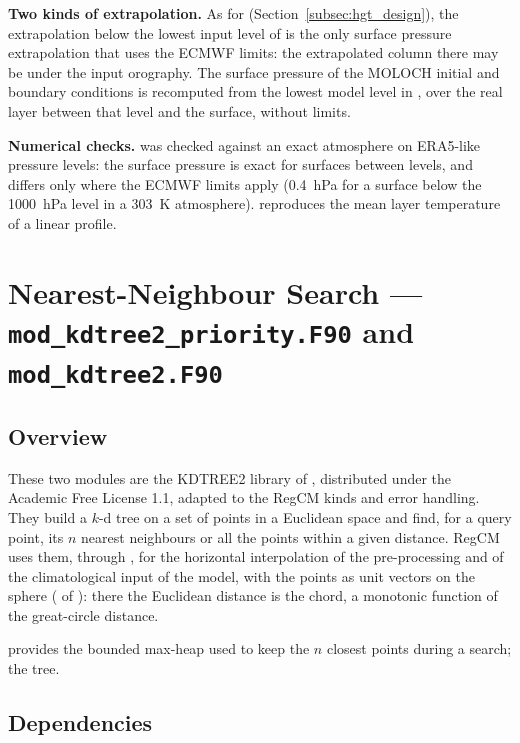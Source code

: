 \textbf{Two kinds of extrapolation.} As for 
(Section~\ref{subsec:hgt_design}), the extrapolation below the lowest
input level of  is the only surface pressure extrapolation
that uses the ECMWF limits: the extrapolated column there may be under the
input orography. The
surface pressure of the MOLOCH initial and boundary conditions is
recomputed from the lowest model level in , over the real
layer between that level and the surface, without limits.

\textbf{Numerical checks.}  was checked against an exact
atmosphere on ERA5-like pressure levels: the surface pressure is exact for
surfaces between levels, and differs only where the ECMWF limits apply
(0.4~hPa for a surface below the 1000~hPa level in a 303~K atmosphere).
 reproduces the mean layer temperature of a linear profile.

\section{Nearest-Neighbour Search --- \texttt{mod\_kdtree2\_priority.F90} and
         \texttt{mod\_kdtree2.F90}}
\label{sec:kdtree2}

\subsection{Overview}

These two modules are the KDTREE2 library of \citet{kennel2004}, distributed
under the Academic Free License 1.1, adapted to the RegCM kinds and error
handling. They build a $k$-d tree on a set of points in a Euclidean space and
find, for a query point, its $n$ nearest neighbours or all the points within
a given distance. RegCM uses them, through , for the
horizontal interpolation of the pre-processing and of the climatological
input of the model, with the points as unit vectors on the sphere
( of ): there the Euclidean distance is the
chord, a monotonic function of the great-circle distance.

 provides the bounded max-heap used to keep the
$n$ closest points during a search;  the tree.

\subsection{Dependencies}

